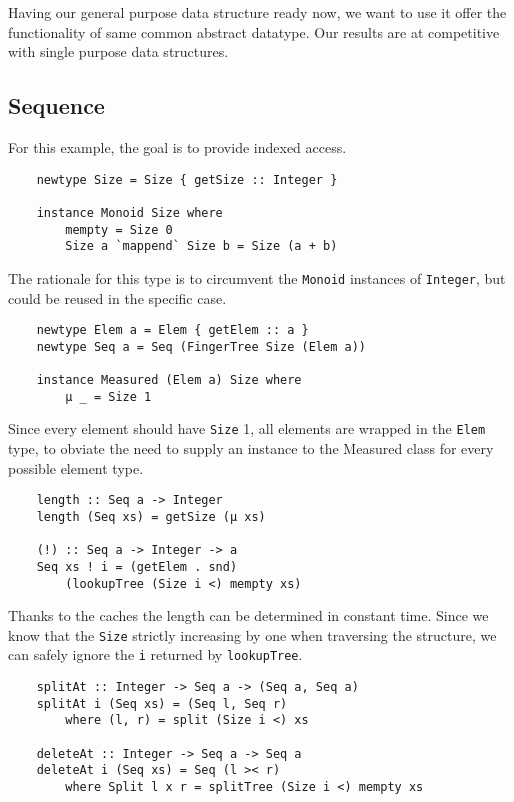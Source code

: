 Having our general purpose data structure ready now, we want to use it offer the functionality of same common abstract datatype. Our results are at competitive with single purpose data structures.

\subsection{Sequence}
For this example, the goal is to provide indexed access. 
\begin{verbatim}
    newtype Size = Size { getSize :: Integer }

    instance Monoid Size where
        mempty = Size 0
        Size a `mappend` Size b = Size (a + b)
\end{verbatim}

The rationale for this type is to circumvent the \texttt{Monoid} instances of \texttt{Integer}, but could be reused in the specific case.

\begin{verbatim}
    newtype Elem a = Elem { getElem :: a }
    newtype Seq a = Seq (FingerTree Size (Elem a))
    
    instance Measured (Elem a) Size where
        μ _ = Size 1
\end{verbatim}

Since every element should have \texttt{Size} 1, all elements are wrapped in the \texttt{Elem} type, to obviate the need to supply an instance to the Measured class for every possible element type.

\begin{verbatim}
    length :: Seq a -> Integer
    length (Seq xs) = getSize (μ xs)

    (!) :: Seq a -> Integer -> a
    Seq xs ! i = (getElem . snd)
        (lookupTree (Size i <) mempty xs)
\end{verbatim}

Thanks to the caches the length can be determined in constant time. Since we know that the \texttt{Size} strictly increasing by one when traversing the structure, we can safely ignore the \texttt{i} returned by \texttt{lookupTree}.

\begin{verbatim}
    splitAt :: Integer -> Seq a -> (Seq a, Seq a)
    splitAt i (Seq xs) = (Seq l, Seq r)
        where (l, r) = split (Size i <) xs

    deleteAt :: Integer -> Seq a -> Seq a
    deleteAt i (Seq xs) = Seq (l >< r)
        where Split l x r = splitTree (Size i <) mempty xs
\end{verbatim}

